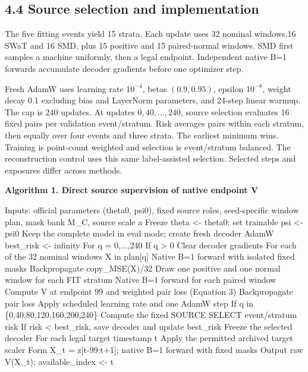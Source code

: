 \documentclass[
  english,
  10pt,
]{article}
\newenvironment{Shaded}{}{}
\newcommand{\NormalTok}[1]{#1}
\begin{document}
\subsection{4.4 Source selection and
implementation}\label{source-selection-and-implementation}

The five fitting events yield 15 strata. Each update uses 32 nominal
windows,16 SWaT and 16 SMD, plus 15 positive and 15 paired-normal
windows. SMD first samples a machine uniformly, then a legal endpoint.
Independent native B=1 forwards accumulate decoder gradients before one
optimizer step.

Fresh AdamW uses learning rate \(10^{-4}\), betas \((0.9,0.95)\),
epsilon \(10^{-8}\), weight decay 0.1 excluding bias and LayerNorm
parameters, and 24-step linear warmup. The cap is 240 updates. At
updates \(0,40,\ldots,240\), source selection evaluates 16 fixed pairs
per validation event/stratum. Risk averages pairs within each stratum,
then equally over four events and three strata. The earliest minimum
wins. Training is point-count weighted and selection is event/stratum
balanced. The reconstruction control uses this same label-assisted
selection. Selected steps and exposures differ across methods.

\textbf{Algorithm 1. Direct source supervision of native endpoint V}

\begin{Shaded}
\begin{Highlighting}[]
\NormalTok{Inputs: official parameters (theta0, psi0), fixed source roles,}
\NormalTok{        seed{-}specific window plan, mask bank M\_C, source scale a}
\NormalTok{Freeze theta \textless{}{-} theta0; set trainable psi \textless{}{-} psi0}
\NormalTok{Keep the complete model in eval mode; create fresh decoder AdamW}
\NormalTok{best\_risk \textless{}{-} infinity}
\NormalTok{For q = 0,...,240}
\NormalTok{    If q \textgreater{} 0}
\NormalTok{        Clear decoder gradients}
\NormalTok{        For each of the 32 nominal windows X in plan[q]}
\NormalTok{            Native B=1 forward with isolated fixed masks}
\NormalTok{            Backpropagate copy\_MSE(X)/32}
\NormalTok{        Draw one positive and one normal window for each FIT stratum}
\NormalTok{        Native B=1 forward for each paired window}
\NormalTok{        Compute V at endpoint 99 and weighted pair loss (Equation 3)}
\NormalTok{        Backpropagate pair loss}
\NormalTok{        Apply scheduled learning rate and one AdamW step}
\NormalTok{    If q in \{0,40,80,120,160,200,240\}}
\NormalTok{        Compute the fixed SOURCE SELECT event/stratum risk}
\NormalTok{        If risk \textless{} best\_risk, save decoder and update best\_risk}
\NormalTok{Freeze the selected decoder}
\NormalTok{For each legal target timestamp t}
\NormalTok{    Apply the permitted archived target scaler}
\NormalTok{    Form X\_t = z[t{-}99:t+1]; native B=1 forward with fixed masks}
\NormalTok{    Output raw V(X\_t); available\_index \textless{}{-} t}
\end{Highlighting}
\end{Shaded}
\end{document}
